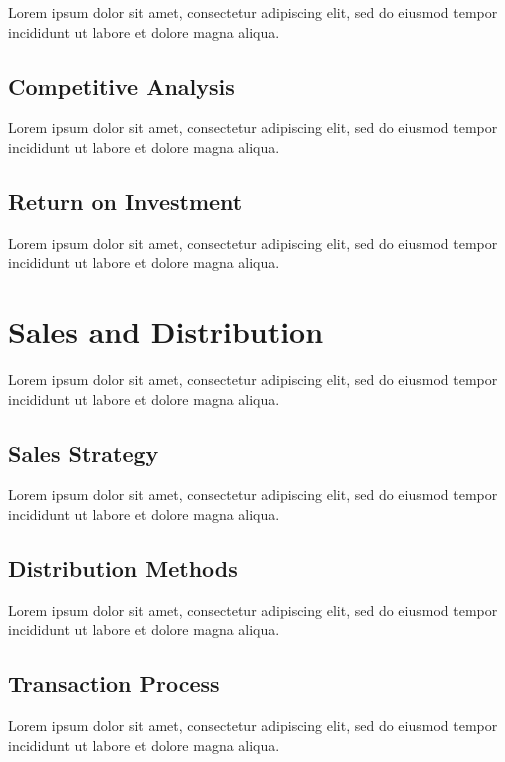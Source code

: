 Lorem ipsum dolor sit amet, consectetur adipiscing elit, sed do eiusmod tempor incididunt ut labore et dolore magna aliqua.

\subsection{Competitive Analysis}

Lorem ipsum dolor sit amet, consectetur adipiscing elit, sed do eiusmod tempor incididunt ut labore et dolore magna aliqua.

\subsection{Return on Investment}

Lorem ipsum dolor sit amet, consectetur adipiscing elit, sed do eiusmod tempor incididunt ut labore et dolore magna aliqua.


\section{Sales and Distribution}

Lorem ipsum dolor sit amet, consectetur adipiscing elit, sed do eiusmod tempor incididunt ut labore et dolore magna aliqua.

\subsection{Sales Strategy}

Lorem ipsum dolor sit amet, consectetur adipiscing elit, sed do eiusmod tempor incididunt ut labore et dolore magna aliqua.

\subsection{Distribution Methods}

Lorem ipsum dolor sit amet, consectetur adipiscing elit, sed do eiusmod tempor incididunt ut labore et dolore magna aliqua.

\subsection{Transaction Process}

Lorem ipsum dolor sit amet, consectetur adipiscing elit, sed do eiusmod tempor incididunt ut labore et dolore magna aliqua.


